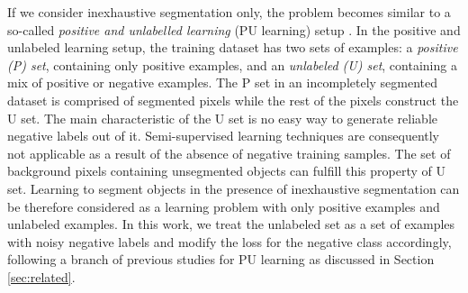 

If we consider inexhaustive segmentation only, the problem becomes similar to a so-called \textit{positive and unlabelled learning} (PU learning) setup \cite{li2005learning}.
In the positive and unlabeled learning setup, the training dataset has two sets of examples: a \textit{positive (P) set}, containing only positive examples, and an \textit{unlabeled (U) set}, containing a mix of positive or negative examples.
The P set in an incompletely segmented dataset is comprised of segmented pixels while the rest of the pixels construct the U set.
The main characteristic of the U set is no easy way to generate reliable negative labels out of it.
Semi-supervised learning techniques are consequently not applicable as a result of the absence of negative training samples.
The set of background pixels containing unsegmented objects can fulfill this property of U set.
Learning to segment objects in the presence of inexhaustive segmentation can be therefore considered as a learning problem with only positive examples and unlabeled examples.
In this work, we treat the unlabeled set as a set of examples with noisy negative labels and modify the loss for the negative class accordingly, following a branch of previous studies for PU learning as discussed in Section \ref{sec:related}.




